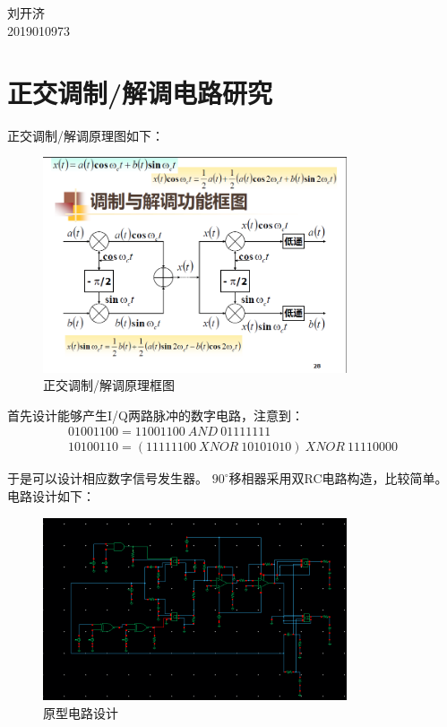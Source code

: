 \documentclass[12pt, a4paper]{article}
\begin{document}
	\begin{center}
		\vspace{0.2in}
		 \\ [12pt]
		  \\ [12pt]
		{\fontsize{14pt}{1.2em}\selectfont
			刘开济\\ [10pt]
			2019010973 \\ [10pt]
		}
	\end{center}
    \section{正交调制/解调电路研究}
    正交调制/解调原理图如下：
        \begin{figure}[H]
    	\centering
    	\includegraphics[width = 0.8\textwidth]{theory}
    	\caption{正交调制/解调原理框图}
    \end{figure}\par
    首先设计能够产生I/Q两路脉冲的数字电路，注意到：
    \begin{gather}
    	01001100 = 11001100 \ AND \ 01111111\\
    	10100110 = (11111100 \ XNOR\  10101010)\  XNOR \ 11110000 
    \end{gather}\par
    于是可以设计相应数字信号发生器。
    $90^{\circ}$移相器采用双RC电路构造，比较简单。电路设计如下：
     \begin{figure}[H]
    	\centering
    	\includegraphics[width = 0.8\textwidth]{circ}
    	\caption{原型电路设计}
    \end{figure}\par
\end{document}
